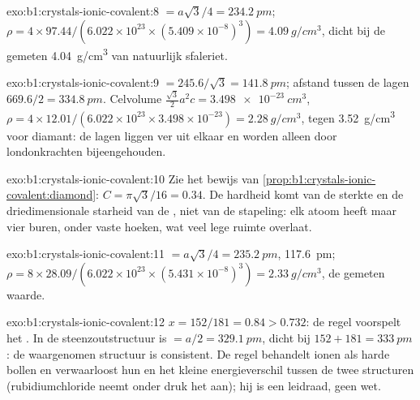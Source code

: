 \begin{solution}{exo:b1:crystals-ionic-covalent:8}
 $= a\sqrt3/4 = \qty{234.2}{pm}$;
$\rho = 4 \times 97.44/(6.022 \times 10^{23} \times (5.409 \times
10^{-8})^3) = \qty{4.09}{g/cm^3}$, dicht bij de gemeten
\qty{4.04}{g/cm^3} van natuurlijk sfaleriet.
\end{solution}

\begin{solution}{exo:b1:crystals-ionic-covalent:9}
 $= 245.6/\sqrt3 = \qty{141.8}{pm}$; afstand tussen de lagen
$669.6/2 =
\qty{334.8}{pm}$. Celvolume $\frac{\sqrt3}{2}a^2c = \qty{3.498e-23}{cm^3}$,
$\rho = 4 \times 12.01/(6.022 \times 10^{23} \times 3.498 \times 10^{-23})
= \qty{2.28}{g/cm^3}$, tegen \qty{3.52}{g/cm^3} voor diamant: de lagen
liggen ver uit elkaar en worden alleen door londonkrachten
bijeengehouden.
\end{solution}

\begin{solution}{exo:b1:crystals-ionic-covalent:10}
Zie het bewijs van \cref{prop:b1:crystals-ionic-covalent:diamond}:
$C = \pi\sqrt3/16 = 0.34$. De hardheid komt van de sterkte en de
driedimensionale starheid van de , niet van de
stapeling: elk atoom heeft maar vier buren, onder vaste hoeken, wat veel
lege ruimte overlaat.
\end{solution}

\begin{solution}{exo:b1:crystals-ionic-covalent:11}
 $= a\sqrt3/4 = \qty{235.2}{pm}$, 
\qty{117.6}{pm}; $\rho = 8 \times 28.09/(6.022 \times 10^{23} \times
(5.431 \times 10^{-8})^3) = \qty{2.33}{g/cm^3}$, de gemeten waarde.
\end{solution}

\begin{solution}{exo:b1:crystals-ionic-covalent:12}
$x = 152/181 = 0.84 > 0.732$: de regel voorspelt het .
In de steenzoutstructuur is  $= a/2 = \qty{329.1}{pm}$, dicht
bij $152 + 181 = \qty{333}{pm}$: de waargenomen structuur is consistent.
De regel behandelt ionen als harde bollen en verwaarloost hun
 en het kleine energieverschil tussen de twee
structuren (rubidiumchloride neemt onder druk het 
aan); hij is een leidraad, geen wet.
\end{solution}

